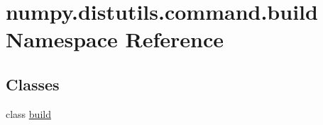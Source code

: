 \hypertarget{namespacenumpy_1_1distutils_1_1command_1_1build}{}\section{numpy.\+distutils.\+command.\+build Namespace Reference}
\label{namespacenumpy_1_1distutils_1_1command_1_1build}
\subsection*{Classes}
\begin{DoxyCompactItemize}
\item 
class \hyperlink{classnumpy_1_1distutils_1_1command_1_1build_1_1build}{build}
\end{DoxyCompactItemize}
